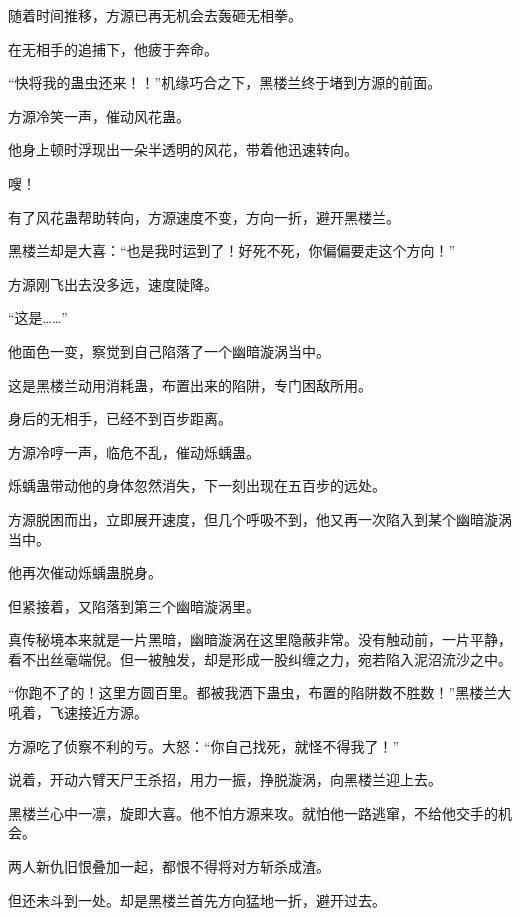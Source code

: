 
\begin{this_body}



随着时间推移，方源已再无机会去轰砸无相拳。

在无相手的追捕下，他疲于奔命。

“快将我的蛊虫还来！！”机缘巧合之下，黑楼兰终于堵到方源的前面。

方源冷笑一声，催动风花蛊。

他身上顿时浮现出一朵半透明的风花，带着他迅速转向。

嗖！

有了风花蛊帮助转向，方源速度不变，方向一折，避开黑楼兰。

黑楼兰却是大喜：“也是我时运到了！好死不死，你偏偏要走这个方向！”

方源刚飞出去没多远，速度陡降。

“这是……”

他面色一变，察觉到自己陷落了一个幽暗漩涡当中。

这是黑楼兰动用消耗蛊，布置出来的陷阱，专门困敌所用。

身后的无相手，已经不到百步距离。

方源冷哼一声，临危不乱，催动烁蝺蛊。

烁蝺蛊带动他的身体忽然消失，下一刻出现在五百步的远处。

方源脱困而出，立即展开速度，但几个呼吸不到，他又再一次陷入到某个幽暗漩涡当中。

他再次催动烁蝺蛊脱身。

但紧接着，又陷落到第三个幽暗漩涡里。

真传秘境本来就是一片黑暗，幽暗漩涡在这里隐蔽非常。没有触动前，一片平静，看不出丝毫端倪。但一被触发，却是形成一股纠缠之力，宛若陷入泥沼流沙之中。

“你跑不了的！这里方圆百里。都被我洒下蛊虫，布置的陷阱数不胜数！”黑楼兰大吼着，飞速接近方源。

方源吃了侦察不利的亏。大怒：“你自己找死，就怪不得我了！”

说着，开动六臂天尸王杀招，用力一振，挣脱漩涡，向黑楼兰迎上去。

黑楼兰心中一凛，旋即大喜。他不怕方源来攻。就怕他一路逃窜，不给他交手的机会。

两人新仇旧恨叠加一起，都恨不得将对方斩杀成渣。

但还未斗到一处。却是黑楼兰首先方向猛地一折，避开过去。


\end{this_body}
